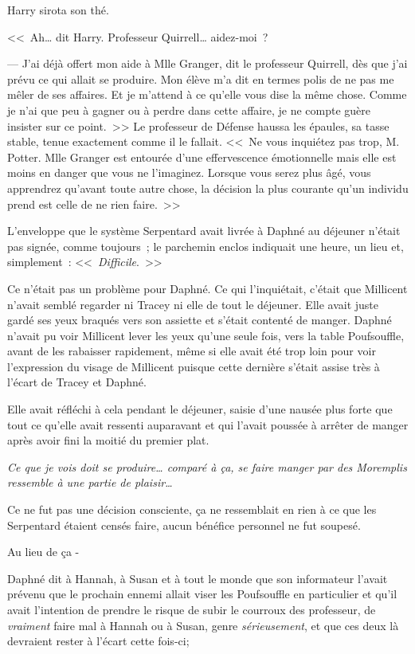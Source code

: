 Harry sirota son thé.

<<~Ah… dit Harry. Professeur Quirrell… aidez-moi~?

--- J'ai déjà offert mon aide à Mlle Granger, dit le professeur Quirrell, dès que j'ai prévu ce qui allait se produire. Mon élève m'a dit en termes polis de ne pas me mêler de ses affaires. Et je m'attend à ce qu'elle vous dise la même chose. Comme je n'ai que peu à gagner ou à perdre dans cette affaire, je ne compte guère insister sur ce point.~>> Le professeur de Défense haussa les épaules, sa tasse stable, tenue exactement comme il le fallait. <<~Ne vous inquiétez pas trop, M. Potter. Mlle Granger est entourée d'une effervescence émotionnelle mais elle est moins en danger que vous ne l'imaginez. Lorsque vous serez plus âgé, vous apprendrez qu'avant toute autre chose, la décision la plus courante qu'un individu prend est celle de ne rien faire.~>>

\later

L'enveloppe que le système Serpentard avait livrée à Daphné au déjeuner n'était pas signée, comme toujours~; le parchemin enclos indiquait une heure, un lieu et, simplement~: <<~\emph{Difficile}.~>>

Ce n'était pas un problème pour Daphné. Ce qui l'inquiétait, c'était que Millicent n'avait semblé regarder ni Tracey ni elle de tout le déjeuner. Elle avait juste gardé ses yeux braqués vers son assiette et s'était contenté de manger. Daphné n'avait pu voir Millicent lever les yeux qu'une seule fois, vers la table Poufsouffle, avant de les rabaisser rapidement, même si elle avait été trop loin pour voir l'expression du visage de Millicent puisque cette dernière s'était assise très à l'écart de Tracey et Daphné.

Elle avait réfléchi à cela pendant le déjeuner, saisie d'une nausée plus forte que tout ce qu'elle avait ressenti auparavant et qui l'avait poussée à arrêter de manger après avoir fini la moitié du premier plat.

\emph{Ce que je vois doit se produire… comparé à ça, se faire manger par des Moremplis ressemble à une partie de plaisir…}

Ce ne fut pas une décision consciente, ça ne ressemblait en rien à ce que les Serpentard étaient censés faire, aucun bénéfice personnel ne fut soupesé.

Au lieu de ça -

Daphné dit à Hannah, à Susan et à tout le monde que son informateur l'avait prévenu que le prochain ennemi allait viser les Poufsouffle en particulier et qu'il avait l'intention de prendre le risque de subir le courroux des professeur, de \emph{vraiment} faire mal à Hannah ou à Susan, genre \emph{sérieusement}, et que ces deux là devraient rester à l'écart cette fois-ci;


